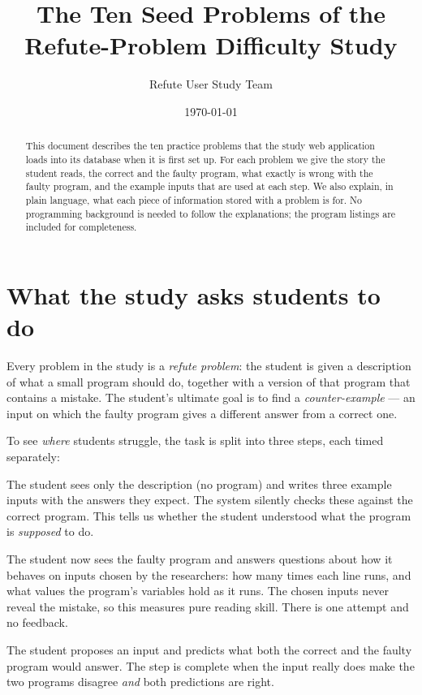 \documentclass[11pt,a4paper]{article}
\title{The Ten Seed Problems of the\\Refute-Problem Difficulty Study}
\author{Refute User Study Team}
\date{\today}
\begin{document}
\maketitle

\begin{abstract}
This document describes the ten practice problems that the study web
application loads into its database when it is first set up. For each
problem we give the story the student reads, the correct and the faulty
program, what exactly is wrong with the faulty program, and the example
inputs that are used at each step. We also explain, in plain language,
what each piece of information stored with a problem is for. No
programming background is needed to follow the explanations; the program
listings are included for completeness.
\end{abstract}

\tableofcontents
\newpage

\section{What the study asks students to do}

Every problem in the study is a \emph{refute problem}: the student is
given a description of what a small program should do, together with a
version of that program that contains a mistake. The student's ultimate
goal is to find a \emph{counter-example} --- an input on which the faulty
program gives a different answer from a correct one.

To see \emph{where} students struggle, the task is split into three
steps, each timed separately:

\begin{description}[leftmargin=1.5em, style=nextline]
  \item[Step 1 --- Understanding the task.]
    The student sees only the description (no program) and writes three
    example inputs with the answers they expect. The system silently
    checks these against the correct program. This tells us whether the
    student understood what the program is \emph{supposed} to do.
  \item[Step 2 --- Reading the faulty program.]
    The student now sees the faulty program and answers questions about
    how it behaves on inputs chosen by the researchers: how many times
    each line runs, and what values the program's variables hold as it
    runs. The chosen inputs never reveal the mistake, so this measures
    pure reading skill. There is one attempt and no feedback.
  \item[Step 3 --- Finding the counter-example.]
    The student proposes an input and predicts what both the correct and
    the faulty program would answer. The step is complete when the input
    really does make the two programs disagree \emph{and} both
    predictions are right.
\end{description}
\end{document}

